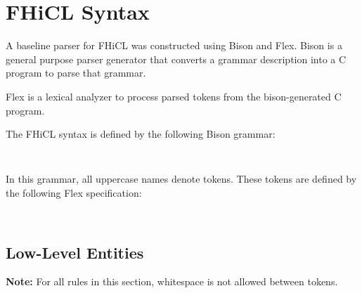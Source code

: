 \documentclass{memarticle}
\begin{document}
\chapter{FHiCL Syntax}{

        A baseline parser for FHiCL was constructed using Bison and Flex.
        Bison is a general purpose parser generator that converts a grammar description into
        a C program to parse that grammar.
        \par
        Flex is a lexical analyzer to process parsed tokens from the bison-generated C program.
        \par
        The FHiCL syntax is defined by the following Bison grammar:
        \begin{verbatim}
        
        \end{verbatim}

        In this grammar,
        all uppercase names denote tokens.
        These tokens are defined by the following Flex specification:
        \begin{verbatim}
        
        \end{verbatim}

        \section{Low-Level Entities}
                \textbf{ Note: } For all rules in this section,
                whitespace is not allowed between tokens.
}
\end{document}

